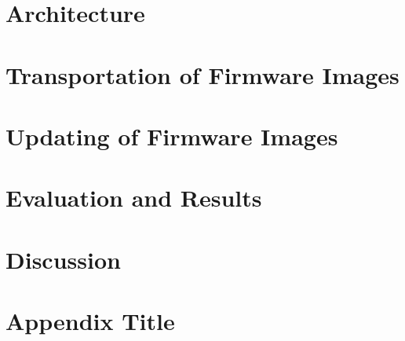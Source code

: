 \documentclass{kththesis}
\begin{document}
\chapter{Architecture}


\chapter{Transportation of Firmware Images}

\chapter{Updating of Firmware Images}


\chapter{Evaluation and Results}


\chapter{Discussion}


\printbibliography[heading=bibintoc] %

\appendix

\chapter{Appendix Title}
\end{document}
